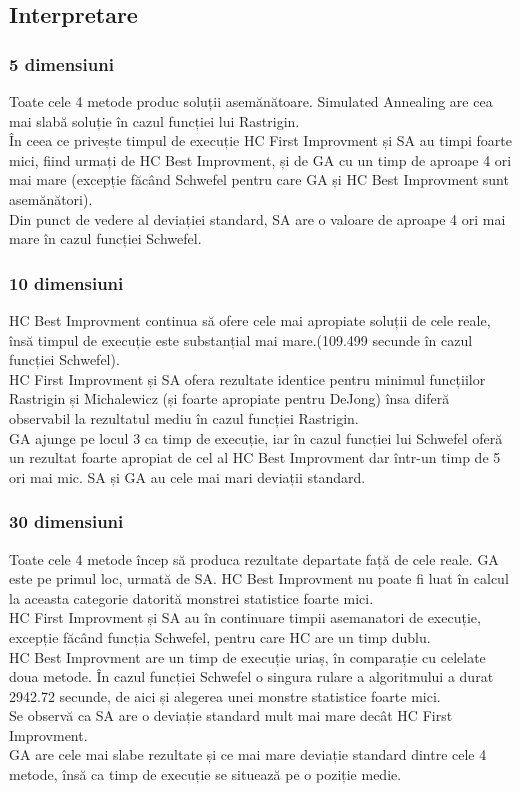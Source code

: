 \documentclass{article}
\begin{document}
\subsection{Interpretare}
\subsubsection{5 dimensiuni}
Toate cele 4 metode produc soluții asemănătoare. Simulated Annealing are cea mai slabă soluție în cazul funcției lui Rastrigin.\\
În ceea ce privește timpul de execuție HC First Improvment și SA au timpi foarte mici, fiind urmați de HC Best Improvment, și de GA cu un timp de aproape 4 ori mai mare (excepție făcând Schwefel pentru care GA și HC Best Improvment sunt asemănători).\\
Din punct de vedere al deviației standard, SA are o valoare de aproape 4 ori mai mare în cazul funcției Schwefel.\\


\subsubsection{10 dimensiuni}
HC Best Improvment continua să ofere cele mai apropiate soluții de cele reale, însă timpul de execuție este substanțial mai mare.(109.499 secunde în cazul funcției Schwefel).\\
HC First Improvment și SA ofera rezultate identice pentru minimul funcțiilor Rastrigin și Michalewicz (și foarte apropiate pentru DeJong) însa diferă observabil la rezultatul mediu în cazul funcției Rastrigin.\\
GA ajunge pe locul 3 ca timp de execuție, iar în cazul funcției lui Schwefel oferă un rezultat foarte apropiat de cel al HC Best Improvment dar într-un timp de 5 ori mai mic.
SA și GA au cele mai mari deviații standard.\\  


\subsubsection{30 dimensiuni}
Toate cele 4 metode încep să produca rezultate departate față de cele reale. GA este pe primul loc, urmată de SA. HC Best Improvment nu poate fi luat în calcul la aceasta categorie datorită monstrei statistice foarte mici.\\
HC First Improvment și SA au în continuare timpii asemanatori de execuție, excepție făcând funcția Schwefel, pentru care HC are un timp dublu.\\
HC Best Improvment are un timp de execuție uriaș, în comparație cu celelate doua metode. În cazul funcției Schwefel o singura rulare a algoritmului a durat 2942.72 secunde, de aici și alegerea unei monstre statistice foarte mici.\\
Se observă ca SA are o deviație standard mult mai mare decât HC First Improvment.\\
GA are cele mai slabe rezultate și ce mai mare deviație standard dintre cele 4 metode, însă ca timp de execuție se situează pe o poziție medie.
\end{document}
